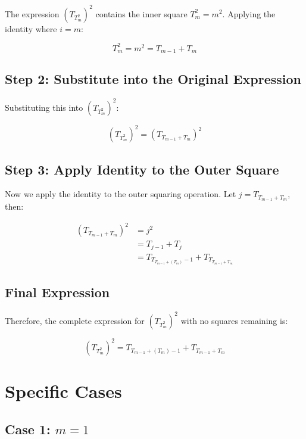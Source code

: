 \documentclass{article}
\begin{document}
The expression $(T_{T_m^2})^2$ contains the inner square $T_m^2 = m^2$. Applying the identity where $i = m$:

\begin{equation}
T_m^2 = m^2 = T_{m-1} + T_m
\end{equation}

\subsection{Step 2: Substitute into the Original Expression}

Substituting this into $(T_{T_m^2})^2$:

\begin{equation}
(T_{T_m^2})^2 = \left(T_{T_{m-1} + T_m}\right)^2
\end{equation}

\subsection{Step 3: Apply Identity to the Outer Square}

Now we apply the identity to the outer squaring operation. Let $j = T_{T_{m-1} + T_m}$, then:

\begin{align}
\left(T_{T_{m-1} + T_m}\right)^2 &= j^2 \\
&= T_{j-1} + T_j \\
&= T_{T_{T_{m-1} + (T_m)} - 1} + T_{T_{T_{m-1} + T_m}}
\end{align}

\subsection{Final Expression}

Therefore, the complete expression for $(T_{T_m^2})^2$ with no squares remaining is:

\begin{equation}
\boxed{(T_{T_m^2})^2 = T_{T_{m-1} + (T_m) - 1} + T_{T_{m-1} + T_m}}
\end{equation}

\section{Specific Cases}

\subsection{Case 1: $m = 1$}
\end{document}
